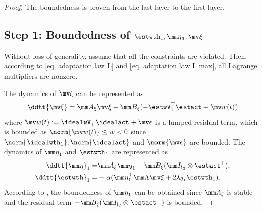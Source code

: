 \documentclass[letterpaper, 10 pt, conference]{ieeeconf}  %
\begin{document}
\begin{proof}
The boundedness is proven from the last layer to the first layer.

\subsection*{Step 1: Boundedness of ${\estwth}_1,{\mm \eta}_1,\mv \xi$}

\color{black}
Without loss of generality, assume that all the constraints are violated. 
Then, according to \eqref{eq. adaptation law L} and \eqref{eq. adaptation law L max}, all Lagrange multipliers are nonzero.
\color{black}

The dynamics of $\mv \xi$ can be represented as
\begin{equation}    
    \ddtt {\mv\xi} = \mm A_\xi\mv \xi +\mm B_\xi
    (
        -\estwV_1^\top \estact+\mv w(t)
    )
\end{equation}
where $\mv w(t):= {\idealwV}_1^{\top}\idealact+\mv \epsilon$ is a lumped residual term, which is bounded as $\norm{\mv  w(t)}\le \bar w< 0$ since $\norm{\idealwth_1},\norm{\idealact}$ and $\norm{\mv\epsilon}$ are bounded.
The dynamics of ${\mm \eta}_1$ and ${\estwth}_1$ are represented as
\begin{equation}
    \begin{aligned}
        \ddtt{\mm \eta}_1 =
        & 
        \mm A_\xi {\mm \eta}_1 -\mm B_\xi (\mm I_{l_{2}}\otimes \estact^\top )
        ,
        \\
        \ddtt{{\estwth}}_1 =
        & -\alpha 
        (
            {\mm \eta}_1^\top 
            \mm \Lambda
            \mv\xi
            +
            2\lambda_{\theta_1} {\estwth}_1
        )
        .
    \end{aligned} 
\end{equation}
According to \cite[Chap.~4 T.~1.9]{Desoer:2009aa}, the boundedness of ${\mm \eta}_1$ can be obtained since $\mm A_\xi$ is stable and the residual term $-\mm B_\xi (\mm I_{l_{2}}\otimes \estact^\top )$ is bounded.


\end{proof}
\end{document}
